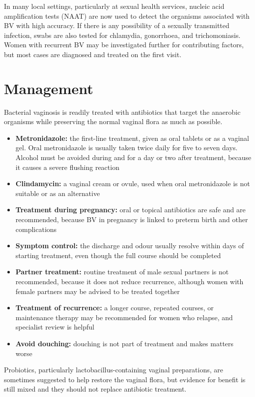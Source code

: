 In many local settings, particularly at sexual health services, nucleic acid amplification tests (NAAT) are now used to detect the organisms associated with BV with high accuracy. If there is any possibility of a sexually transmitted infection, swabs are also tested for chlamydia, gonorrhoea, and trichomoniasis. Women with recurrent BV may be investigated further for contributing factors, but most cases are diagnosed and treated on the first visit.

\section*{Management}
Bacterial vaginosis is readily treated with antibiotics that target the anaerobic organisms while preserving the normal vaginal flora as much as possible.

\begin{itemize}
    \item \textbf{Metronidazole:} the first-line treatment, given as oral tablets or as a vaginal gel. Oral metronidazole is usually taken twice daily for five to seven days. Alcohol must be avoided during and for a day or two after treatment, because it causes a severe flushing reaction
    \item \textbf{Clindamycin:} a vaginal cream or ovule, used when oral metronidazole is not suitable or as an alternative
    \item \textbf{Treatment during pregnancy:} oral or topical antibiotics are safe and are recommended, because BV in pregnancy is linked to preterm birth and other complications
    \item \textbf{Symptom control:} the discharge and odour usually resolve within days of starting treatment, even though the full course should be completed
    \item \textbf{Partner treatment:} routine treatment of male sexual partners is not recommended, because it does not reduce recurrence, although women with female partners may be advised to be treated together
    \item \textbf{Treatment of recurrence:} a longer course, repeated courses, or maintenance therapy may be recommended for women who relapse, and specialist review is helpful
    \item \textbf{Avoid douching:} douching is not part of treatment and makes matters worse
\end{itemize}

Probiotics, particularly lactobacillus-containing vaginal preparations, are sometimes suggested to help restore the vaginal flora, but evidence for benefit is still mixed and they should not replace antibiotic treatment.

